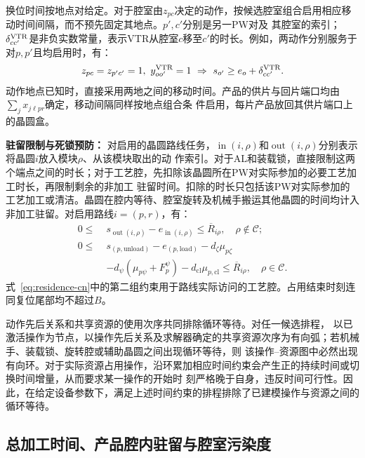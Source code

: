 \documentclass[final,5p,times,twocolumn]{elsarticle}
\begin{document}
换位时间按地点对给定。对于腔室由$z_{pc}$决定的动作，按候选腔室组合启用相应移动时间间隔，而不预先固定其地点。$p',c'$分别是另一PW对及
其腔室的索引；$\delta^{\rm VTR}_{cc'}$是非负实数常量，表示VTR从腔室$c$移至$c'$的时长。例如，两动作分别服务于对$p,p'$且均启用时，有：
\begin{equation}
\begin{aligned}
z_{pc}=z_{p'c'}=1,\ y^{\rm VTR}_{oo'}=1
\ \Rightarrow\ s_{o'}\ge e_o+\delta^{\rm VTR}_{cc'}.
\end{aligned}
\label{eq:location-travel-cn}
\end{equation}
动作地点已知时，直接采用两地之间的移动时间。产品的供片与回片端口均由$\sum_jx_{j\ell pr}$确定，移动间隔同样按地点组合条
件启用，每片产品放回其供片端口上的晶圆盒。

\noindent\textbf{驻留限制与死锁预防：}
对启用的晶圆路线任务，$\operatorname{in}(i,\rho)$和$\operatorname{out}(i,\rho)$分别表示将晶圆$i$放入模块$\rho$、从该模块取出的动
作索引。对于AL和装载锁，直接限制这两个端点之间的时长；对于工艺腔，先扣除该晶圆所在PW对实际参加的必要工艺加工时长，再限制剩余的非加工
驻留时间。扣除的时长只包括该PW对实际参加的工艺加工或清洁。晶圆在腔内等待、腔室旋转及机械手搬运其他晶圆的时间均计入非加工驻留。对启用路线$i=(p,r)$，有：
\begin{equation}
\begin{aligned}
0\le\;&s_{\operatorname{out}(i,\rho)}-e_{\operatorname{in}(i,\rho)}
\le\overline R_{i\rho},\quad \rho\notin\mathcal C;\\
0\le\;&s_{(p,\mathrm{unload})}-e_{(p,\mathrm{load})}
-d_\zeta\mu_{p\zeta}\\
&-d_\psi(\mu_{p\psi}+F_p^\psi)
-d_{\mathrm{cl}}\mu_{p,\mathrm{cl}}\le\overline R_{i\rho},
\quad\rho\in\mathcal C.
\end{aligned}
\label{eq:residence-cn}
\end{equation}
式~\eqref{eq:residence-cn}中的第二组约束用于路线实际访问的工艺腔。占用结束时刻连同复位尾部均不超过$B$。

动作先后关系和共享资源的使用次序共同排除循环等待。对任一候选排程，
以已激活操作为节点，以操作先后关系及求解器确定的共享资源次序为有向弧；若机械手、装载锁、旋转腔或辅助晶圆之间出现循环等待，则
该操作--资源图中必然出现有向环。对于实际资源占用操作，沿环累加相应时间约束会产生正的持续时间或切换时间增量，从而要求某一操作的开始时
刻严格晚于自身，违反时间可行性。因此，在给定设备参数下，满足上述时间约束的排程排除了已建模操作与资源之间的循环等待。

\subsection{总加工时间、产品腔内驻留与腔室污染度}
\label{sec:model-objective-cn}
\end{document}
